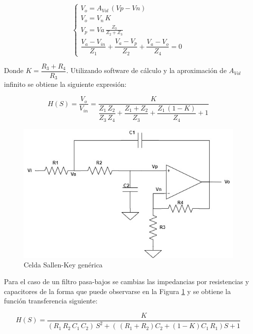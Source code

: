 \begin{equation}
	\begin{cases}	
			V_o = A_{Vol} \, (Vp - Vn) \\
			V_o = V_n \, K \\
			V_p = Va \, \frac{Z_3}{Z_2 + Z_3} \\
			\dfrac{V_a - V_{in}}{Z_1} + \dfrac{V_a - V_p}{Z_2} + \dfrac{V_a - V_o}{Z_4} = 0		
	\end{cases}
\end{equation}

Donde $K = \dfrac{R_3 + R_4}{R_3}$. Utilizando software de cálculo y la aproximación de $A_{Vol}$ infinito se obtiene la siguiente expresión:

\begin{equation}
	H(S) = \dfrac{V_o}{V_{in}} =\dfrac{K}{\dfrac{Z_1 \, Z_2}{Z_3 \, Z_4} + \dfrac{Z_1 + Z_2}{Z_3} + \dfrac{Z_1 \, (1-K)}{Z_4} + 1}	
\end{equation}

\begin{figure}[H]
	\centering
	\includegraphics[scale=0.5]{../Ex1/Informe/sallenkeypasabajos.jpg}
	\caption{Celda Sallen-Key genérica}
	\label{fig:sallenkeypasabajos}
\end{figure}
	
	Para el caso de un filtro pasa-bajos se cambias las impedancias por resistencias y capacitores de la forma que puede observarse en la Figura \ref{fig:sallenkeypasabajos} y se obtiene la función transferencia siguiente:

\begin{equation}
		H(S) = \dfrac{K}{(R_1 \, R_2 \, C_1 \, C_2) \, S^2 + ( \,(R_1 + R_2) C_2 + (1-K)C_1 \, R_1) S +1}
\end{equation}

